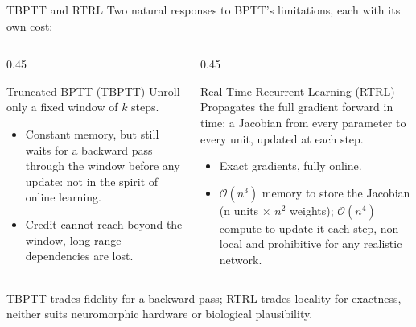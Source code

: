 \documentclass[aspectratio=169,11pt]{beamer}
\begin{document}
\begin{frame}{TBPTT and RTRL}
  Two natural responses to BPTT's limitations, each with its own cost:
  \begin{columns}[T]
    \begin{column}{0.45\textwidth}
        \begin{block}{Truncated BPTT (TBPTT)}
          Unroll only a fixed window of $k$ steps.
          \begin{itemize}
            \item Constant memory, but still waits for a backward pass through the
                  window before any update: not in the spirit of online learning.
            \item Credit cannot reach beyond the window, 
                  long-range dependencies are lost.
          \end{itemize}
        \end{block}
    \end{column}
    \begin{column}{0.45\textwidth}
        \begin{block}{Real-Time Recurrent Learning (RTRL)}
          Propagates the full gradient forward in time: a Jacobian from every
          parameter to every unit, updated at each step.
          \begin{itemize}
            \item Exact gradients, fully online.
            \item $\mathcal{O}(n^3)$ memory to store the Jacobian (n units
                  $\times$ $n^2$ weights); $\mathcal{O}(n^4)$ compute to update
                  it each step, non-local and prohibitive for any realistic
                  network.
          \end{itemize}
        \end{block}
    \end{column}
  \end{columns}
  \vfill
    \centering\footnotesize
    TBPTT trades fidelity for a backward pass; RTRL trades locality for
    exactness, neither suits neuromorphic hardware or biological plausibility.
\end{frame}
\end{document}
